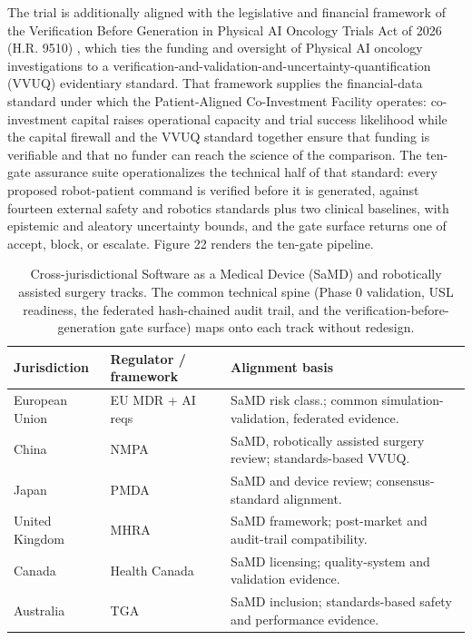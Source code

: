 The trial is additionally aligned with the legislative and financial framework of
the Verification Before Generation in Physical AI Oncology Trials Act of 2026 (H.R.
9510) \cite{kawchak2026hr9510}, which ties the funding and oversight of Physical AI
oncology investigations to a verification-and-validation-and-uncertainty-quantification
(VVUQ) evidentiary standard. That framework supplies the financial-data standard
under which the Patient-Aligned Co-Investment Facility operates: co-investment
capital raises operational capacity and trial success likelihood while the capital
firewall and the VVUQ standard together ensure that funding is verifiable and that
no funder can reach the science of the comparison. The ten-gate assurance suite
operationalizes the technical half of that standard: every proposed robot-patient
command is verified before it is generated, against fourteen external safety and
robotics standards plus two clinical baselines, with epistemic and aleatory
uncertainty bounds, and the gate surface returns one of accept, block, or escalate.
Figure 22 renders the ten-gate pipeline.

\begin{table}[htbp]
\centering
\footnotesize
\caption{Cross-jurisdictional Software as a Medical Device (SaMD) and robotically
assisted surgery tracks. The common technical spine (Phase 0 validation, USL
readiness, the federated hash-chained audit trail, and the
verification-before-generation gate surface) maps onto each track without redesign.}
\label{tab:jurisdictions}
\begin{tabularx}{\textwidth}{L{2.4cm} L{3.2cm} Y}
\toprule
\textbf{Jurisdiction} & \textbf{Regulator / framework} & \textbf{Alignment basis} \\
\midrule
European Union & EU MDR + AI reqs & SaMD risk class.; common simulation-validation, federated evidence. \\
China & NMPA & SaMD, robotically assisted surgery review; standards-based VVUQ. \\
Japan & PMDA & SaMD and device review; consensus-standard alignment. \\
United Kingdom & MHRA & SaMD framework; post-market and audit-trail compatibility. \\
Canada & Health Canada & SaMD licensing; quality-system and validation evidence. \\
Australia & TGA & SaMD inclusion; standards-based safety and performance evidence. \\
\bottomrule
\end{tabularx}
\end{table}

